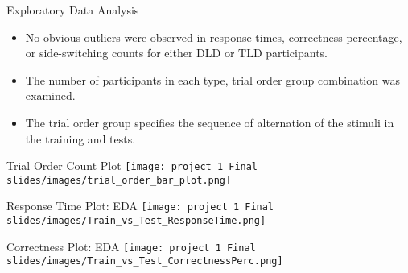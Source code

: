 \documentclass[
]{beamer}
\begin{document}

\begin{frame}{Exploratory Data Analysis}
\begin{itemize}
  \item No obvious outliers were observed in response times, correctness percentage, or side-switching counts for either DLD or TLD participants.
  \item The number of participants in each type, trial order group combination was examined.
  \item The trial order group specifies the sequence of alternation of the stimuli in the training and tests.
\end{itemize}
\end{frame}


\begin{frame}{Trial Order Count Plot}
\centering
\texttt{[image: project 1 Final slides/images/trial\_order\_bar\_plot.png]}
\end{frame}


\begin{frame}{Response Time Plot: EDA}
\centering
\texttt{[image: project 1 Final slides/images/Train\_vs\_Test\_ResponseTime.png]}
\end{frame}


\begin{frame}{Correctness Plot: EDA}
\centering
\texttt{[image: project 1 Final slides/images/Train\_vs\_Test\_CorrectnessPerc.png]}
\end{frame}

\end{document}

